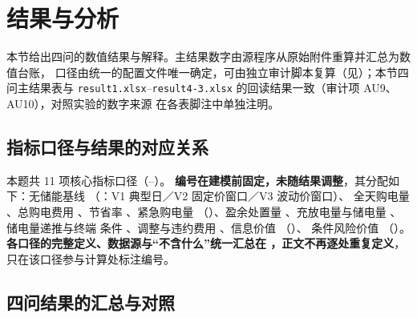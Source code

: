 
\section{结果与分析}\label{chap:results}

本节给出四问的数值结果与解释。主结果数字由源程序从原始附件重算并汇总为数值台账，
口径由统一的配置文件唯一确定，可由独立审计脚本复算（见）；本节四问主结果表与
\texttt{result1.xlsx}--\texttt{result4-3.xlsx} 的回读结果一致（审计项 AU9、AU10），对照实验的数字来源
在各表脚注中单独注明。

\subsection{指标口径与结果的对应关系}

本题共 11 项核心指标口径（--）。
\textbf{编号在建模前固定，未随结果调整}，其分配如下：无储能基线 （：V1 典型日／V2 固定价窗口／V3 波动价窗口）、
全天购电量 、总购电费用 、节省率 、紧急购电量 
（）、盈余处置量 、充放电量与储电量 、储电量递推与终端
条件 、调整与违约费用 、信息价值 （）、
条件风险价值 （）。\textbf{各口径的完整定义、数据源与“不含什么”统一汇总在
，正文不再逐处重复定义}，只在该口径参与计算处标注编号。

\subsection{四问结果的汇总与对照}

